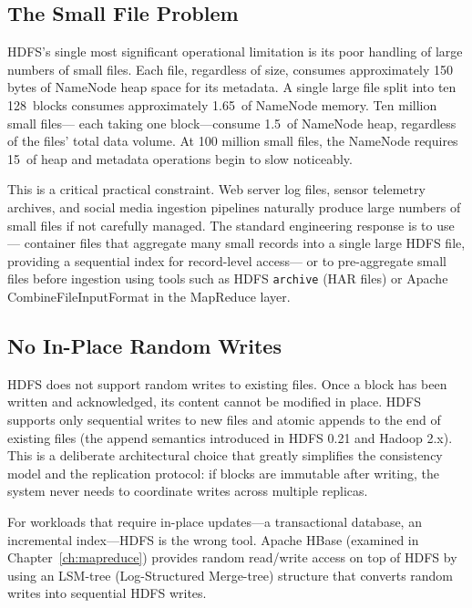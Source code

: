 \subsection{The Small File Problem}
\label{subsec:small-file}

HDFS's single most significant operational limitation is its poor
handling of large numbers of small files. Each file, regardless of
size, consumes approximately 150 bytes of NameNode heap space for its
metadata. A single large file split into ten 128\MB\ blocks consumes
approximately 1.65\KB\ of NameNode memory. Ten million small files---
each taking one block---consume 1.5\GB\ of NameNode heap, regardless
of the files' total data volume. At 100 million small files, the
NameNode requires 15\GB\ of heap and metadata operations begin to slow
noticeably.

This is a critical practical constraint. Web server log files,
sensor telemetry archives, and social media ingestion pipelines
naturally produce large numbers of small files if not carefully managed.
The standard engineering response is to use ---
container files that aggregate many small records into a single large
HDFS file, providing a sequential index for record-level access---
or to pre-aggregate small files before ingestion using tools such as
HDFS \texttt{archive} (HAR files) or Apache CombineFileInputFormat
in the MapReduce layer.

\subsection{No In-Place Random Writes}
\label{subsec:no-random-write}

HDFS does not support random writes to existing files. Once a block
has been written and acknowledged, its content cannot be modified
in place. HDFS supports only sequential writes to new files and
atomic appends to the end of existing files (the append semantics
introduced in HDFS 0.21 and Hadoop 2.x). This is a deliberate
architectural choice that greatly simplifies the consistency model and
the replication protocol: if blocks are immutable after writing, the
system never needs to coordinate writes across multiple replicas.

For workloads that require in-place updates---a transactional database,
an incremental index---HDFS is the wrong tool. Apache HBase (examined
in Chapter~\ref{ch:mapreduce}) provides random read/write access on
top of HDFS by using an LSM-tree (Log-Structured Merge-tree) structure
that converts random writes into sequential HDFS writes.

